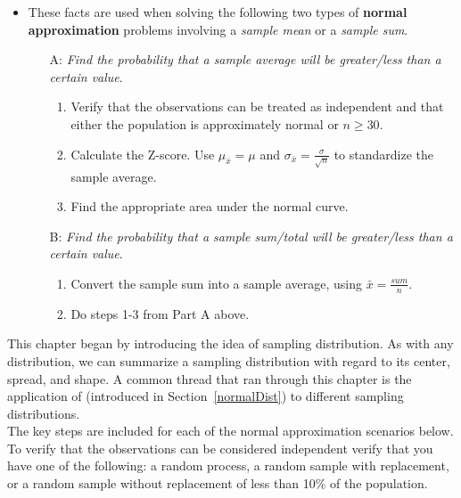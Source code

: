 \begin{itemize}
\item These facts are used when solving the following two types of \textbf{normal approximation} problems involving a \emph{sample mean} or a \emph{sample sum}.  
\begin{itemize}
\item[A:] \textit{Find the probability that a sample average will be greater/less than a certain value}.
\begin{enumerate}\vspace{-1mm}
\setlength{\itemsep}{0mm}
\item Verify that the observations can be treated as independent and that either the population is approximately normal or $n \ge 30$.
\item Calculate the Z-score.  Use $\mu_{\bar{x}}=\mu$ and $\sigma_{\bar{x}}=\frac{\sigma}{\sqrt{n}}$ to standardize the sample average.  
\item Find the appropriate area under the normal curve.  
\end{enumerate}

\item[B:] \textit{Find the probability that a sample sum/total will be greater/less than a certain value}.
\begin{enumerate}\vspace{-1mm}
\setlength{\itemsep}{0mm}
\item Convert the sample sum into a sample average, using $\bar{x} = \frac{sum}{n}$.  
\item Do steps 1-3 from Part A above.
\end{enumerate}
\end{itemize}
\end{itemize}

{}


\reviewchapterheader{}

\noindent This chapter began by introducing the idea of sampling distribution.  As with any distribution, we can summarize a sampling distribution with regard to its center, spread, and shape.  A common thread that ran through this chapter is the application of  (introduced in Section~\ref{normalDist}) to different sampling distributions.
\\

\noindent The key steps are included for each of the normal approximation scenarios below.  To verify that the observations can be considered independent verify that you have one of the following: a random process, a random sample with replacement, or a random sample without replacement of less than 10\% of the population.

